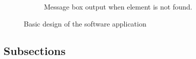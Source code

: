 \documentclass[12pt,a4paper]{article}
\begin{document}
\begin{figure}[h]
\begin{subfigure}[b]{0.45\linewidth}
            \caption{Message box output when element is not found.}
            \label{fig:sub2}
        \end{subfigure}
        \caption{Basic design of the software application}
        \label{fig:overall}
    \end{figure}
\subsection{Subsections}
\end{document}
